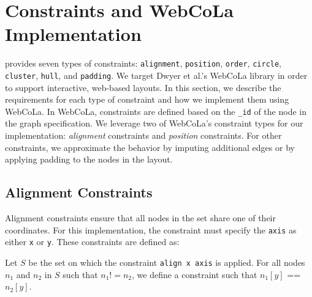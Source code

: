 \section{\projectname Constraints and WebCoLa Implementation}
\label{sec:constraints}

\projectname provides seven types of constraints:
\texttt{alignment}, \texttt{position}, \texttt{order}, \texttt{circle},
\texttt{cluster}, \texttt{hull}, and \texttt{padding}. We
target  Dwyer et al.'s WebCoLa library \cite{WebCoLa} in order to support
interactive, web-based layouts. In this section, we describe the requirements 
for each type of constraint and how we implement them using WebCoLa.
In WebCoLa, constraints are defined based on the \texttt{\_id} of the
node in the graph specification. We leverage two of WebCoLa's
constraint types for our implementation: \emph{alignment} constraints 
and \emph{position} constraints. For other \projectname constraints, we
approximate the behavior by imputing additional edges or by applying
padding to the nodes in the layout.


\subsection{Alignment Constraints}

Alignment constraints ensure that all nodes in the set share one of their
coordinates. For this implementation, the constraint must specify the \texttt{axis}
as either \texttt{x} or \texttt{y}. These constraints are defined as:

\begin{definition}
Let $S$ be the set on which the constraint \texttt{align x axis} is applied.
For all nodes $n_1$ and $n_2$ in $S$ such that $n_1 != n_2$, we define 
a constraint such that $n_1[y]$ == $n_2[y]$.
\end{definition}



